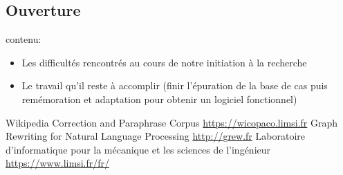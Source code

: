 \documentclass[11pt]{article}
\begin{document}
\subsection{Ouverture}
contenu:
\begin{itemize}
\item Les difficult\'{e}s rencontr\'{e}s au cours de notre initiation \`{a} la recherche
\item Le travail qu'il reste \`{a} accomplir (finir l'\'{e}puration de la base de cas puis rem\'{e}moration et adaptation pour obtenir un logiciel fonctionnel)
\end{itemize}







\begin{thebibliography}{1}
   Wikipedia Correction and Paraphrase Corpus \url{https://wicopaco.limsi.fr}
   Graph Rewriting for Natural Language Processing \url{http://grew.fr}
   Laboratoire d'informatique pour la m\'{e}canique et les sciences de l'ing\'{e}nieur \url{https://www.limsi.fr/fr/}
  
\end{thebibliography}
\end{document}
